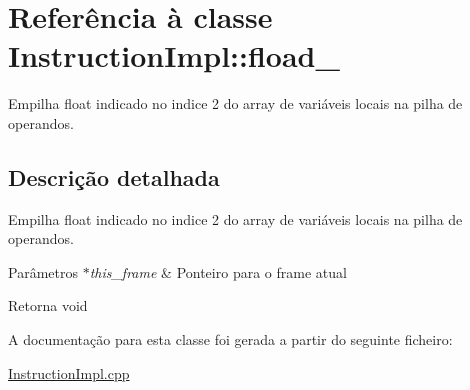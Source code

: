 \hypertarget{class_instruction_impl_1_1fload__2}{}\section{Referência à classe Instruction\+Impl\+:\+:fload\+\_}
\label{class_instruction_impl_1_1fload__2}


Empilha float indicado no indice 2 do array de variáveis locais na pilha de operandos.  




\subsection{Descrição detalhada}
Empilha float indicado no indice 2 do array de variáveis locais na pilha de operandos. 


\begin{DoxyParams}{Parâmetros}
{\em $\ast$this\+\_\+frame} & Ponteiro para o frame atual \\
\hline
\end{DoxyParams}
\begin{DoxyReturn}{Retorna}
void 
\end{DoxyReturn}


A documentação para esta classe foi gerada a partir do seguinte ficheiro\+:\begin{DoxyCompactItemize}
\item 
\hyperlink{_instruction_impl_8cpp}{Instruction\+Impl.\+cpp}\end{DoxyCompactItemize}
